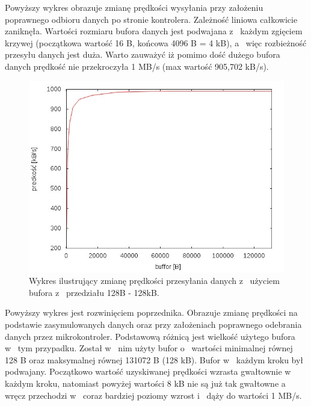 \documentclass{BscUS}
\begin{document}
\noindent Powyższy wykres obrazuje zmianę prędkości wysyłania przy założeniu poprawnego odbioru danych po stronie kontrolera. Zależność liniowa całkowicie zaniknęła. Wartości rozmiaru bufora danych jest podwajana z~ każdym zgięciem krzywej (początkowa wartość 16 B, końcowa 4096 B = 4 kB), a~ więc rozbieżność przesyłu danych jest duża. Warto zauważyć iż pomimo dość dużego bufora danych prędkość nie przekroczyła 1 MB/s (max wartość 905,702 kB/s).
\begin{figure}[H]
{
\centering
\includegraphics[width=1\textwidth]{./img/S_bbuf2}
\caption{Wykres ilustrujący zmianę prędkości przesyłania danych z~ użyciem bufora z~ przedziału 128B - 128kB.}
\label{fig:S_bbuf2}
}
\end{figure}
\noindent Powyższy wykres jest rozwinięciem poprzednika. Obrazuje zmianę prędkości na podstawie zasymulowanych danych oraz przy założeniach poprawnego odebrania danych przez mikrokontroler. Podstawową różnicą jest wielkość użytego bufora w~ tym przypadku. Został w~ nim użyty bufor o~ wartości minimalnej równej 128 B oraz maksymalnej równej 131072 B (128 kB). Bufor w~ każdym kroku był podwajany. Początkowo wartość uzyskiwanej prędkości wzrasta gwałtownie w~ każdym kroku, natomiast powyżej wartości 8 kB nie są już tak gwałtowne a~ wręcz przechodzi w~ coraz bardziej poziomy wzrost i~ dąży do wartości 1 MB/s. 
\newline
\end{document}
